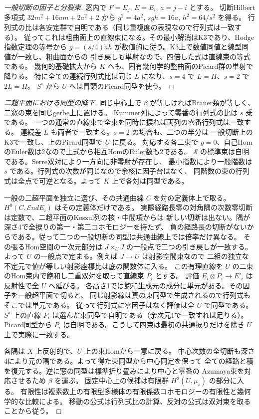 \begin{proof}[一般切断の因子と分裂束]
窓内で $F=E_j$, $E=E_i$, $a=j-i$ とする。
切断Hilbert多項式 $32m^2+16am+2a^2+2$ から
$g^2=4a^2$, $sgh=16a$, $h^2=64/s^2$ を得る。
行列式の比は各安定群で自明である（同じ重複度の表現なので行列式は一致する）。
従ってこれは粗曲面上の直線束になる。その最小解消はK3であり、Hodge指数定理の等号から
$g=(s/4)a h$ が数値的に従う。K3上で数値同値と線型同値が一致し、粗曲面からの
引き戻しも単射なので、四倍した式は直線束の等式である。
幾何的基礎拡大から $K$ へも、固有幾何学的整曲面のPicard群の単射で降りる。
特に全ての連続行列式比は同じ $L$ になり、$s=4$ で $L=H$、$s=2$ で $2L=H$。
$S^\circ$ から $U$ へは冒頭のPicard同型を使う。
\end{proof}

\begin{proof}[二超平面における同型の降下]
同じ中心上で $\beta$ が等しければBrauer類が等しく、二窓の束を同じgerbe上に置ける。
Kummer列によって零番の行列式の比は $s$ 乗である。
一つの通常の直線束で全束を同時に捩れば両列の零番行列式は一致する。
連続差 $L$ も両者で一致する。$s=2$ の場合も、二つの半分は
一般切断上のK3で一致し、上のPicard同型で $U$ に戻る。
対応する各二束で $g=0$、自己HomのEuler数は2なので上式から相互HomのEuler数も2である。
$\mathcal S$ の標準束は自明である。Serre双対により一方向に非零射が存在し、
最小指数により一般階数は $s$ である。行列式の次数が同じなので余核に因子台はなく、
同階数の束の行列式は全点で可逆となる。よって $K$ 上で各対は同型である。

一般の二超平面を独立に選び、その共通曲線 $C$ を対の定義体上で取る。
$H^0(C,\mathcal End E_i)$ はその定義体だけである。
実際経路長零の対角隅の次数零切断は定数で、二超平面のKoszul列の核・中間項からは
新しい切断は出ない。隅が深さ4で全捩りの第一・第二コホモロジーを持たず、
負の経路長の切断がないからである。従って二つの一般切断の同型は共通曲線上では倍率だけ異なる。
その張るHom空間の一次元部分は $J\times_U J$ の一般点で二つの引き戻しが一致する。
よって $U$ の一般点で定まる。例えば $J\to U$ は射影空間束なので
二組の独立な不定元で値が等しい射影座標比は底の関数体に入る。
この有理直線を $U$ の二束のHom束内で飽和し二重双対を取って直線束 $P_i$ とする。
評価 $E_i\otimes P_i\to E'_i$ は反射性で全 $U$ へ延びる。
各高さ1では飽和生成元の成分に単元がある。その因子を一般超平面で切ると、
同じ射影線は真の束同型で生成されるので行列式もそこでは単元である。
従って行列式に零因子はなく評価は全 $U$ で同型である。
$S^\circ$ 上の直線 $P_i$ は選んだ束同型で自明である（余次元1で一致すれば足りる）。
Picard同型から $P_i$ は自明である。こうして四束は最初の共通捩りだけを除き
$U$ 上で実際に一致する。

各隅は $X$ 上反射的で、$U$ 上の束Homから一意に戻る。
中心次数の全切断も深さ4により元の隅である。よって得た束同型から中心同定を保って
全ての経路と積を復元する。逆に窓の同型は標準折り畳みにより中心と零番の
Azumaya束を対応させるため $\beta$ を運ぶ。
固定中心上の候補は有限群 $H^2(U,\mu_s)$ の部分に入る。
有限性は複素数上の有限型多様体の有限係数コホモロジーの有限性と幾何学的な比較による。
移動の公式は行列式比の計算、反対の公式は双対束を取ることから従う。
\end{proof}
